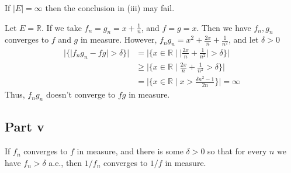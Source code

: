 \begin{question}
   If $|E|=\infty$ then the conclusion in (iii) may fail.
\end{question}

\begin{answer}
    Let $E = \mathbb{R}$. If we take $f_n = g_n = x + \tfrac{1}{n}$, and $f = g = x$. Then we have $f_n,g_n$ converges to $f$ and $g$ in measure. However, $f_ng_n = x^2 + \tfrac{2x}{n} + \tfrac{1}{n^2}$, and let $\delta > 0$
    \begin{equation}
        \begin{aligned}
            \lvert \{\lvert f_ng_n - fg \rvert > \delta\} \rvert &= \lvert \{x \in \mathbb{R} \mid \lvert \tfrac{2x}{n} + \tfrac{1}{n^2}\rvert > \delta\} \rvert\\
            &\geq  \lvert \{x \in \mathbb{R} \mid  \tfrac{2x}{n} + \tfrac{1}{n^2} > \delta\} \rvert\\
            &= \lvert \{ x \in \mathbb{R} \mid x > \tfrac{\delta n^2 - 1}{2n} \} \rvert = \infty
        \end{aligned}
    \end{equation}
    Thus, $f_ng_n$ doesn't converge to $fg$ in measure.
\end{answer}

\subsection{Part v}

\begin{question}
   If $f_n$ converges to $f$ in measure, and there is some $\delta>0$ so that for every $n$ we have $f_n>\delta$ a.e., then $1 / f_n$ converges to $1 / f$ in measure.
\end{question}

